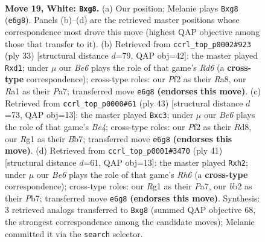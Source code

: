 \documentclass[11pt]{article}
\begin{document}
\clearpage

\begin{figure}[p]\centering
\begin{subfigure}{0.46\textwidth}\centering
\resizebox{\linewidth}{!}{%
\newchessgame
\chessboard[
  setfen={2kr2r1/1ppnp2p/2n1B1p1/p7/5B1P/N4P2/PbP1KP2/R5R1 w - - 2 19},
  showmover=false,
  pgfstyle=straightmove, color=movearrow, markmove={e6-g8}
]}
\caption{}
\end{subfigure}\hfill
\begin{subfigure}{0.46\textwidth}\centering
\resizebox{\linewidth}{!}{%
\newchessgame
\chessboard[
  setfen={r5k1/pb2pp1p/5bp1/8/8/2NrPN2/PP3PPP/3R1RK1 b - - 1 17},
  showmover=false,
  pgfstyle=straightmove, color=movearrow, markmove={d3-d1}
]}
\caption{}
\end{subfigure}
\\[4pt]
\begin{subfigure}{0.46\textwidth}\centering
\resizebox{\linewidth}{!}{%
\newchessgame
\chessboard[
  setfen={3r1rk1/1b3p2/pp4p1/3Pb2p/8/1PN3P1/P4PNP/2RR2K1 b - - 2 22},
  showmover=false,
  pgfstyle=straightmove, color=movearrow, markmove={e5-c3}
]}
\caption{}
\end{subfigure}\hfill
\begin{subfigure}{0.46\textwidth}\centering
\resizebox{\linewidth}{!}{%
\newchessgame
\chessboard[
  setfen={2r3k1/pp4pp/4p1n1/2p1b3/4P3/2PPB2r/PP2KN1P/R6R b - - 5 21},
  showmover=false,
  pgfstyle=straightmove, color=movearrow, markmove={h3-h2}
]}
\caption{}
\end{subfigure}
\caption{\textbf{Move 19, White: \texttt{Bxg8}.} (a) Our position; Melanie plays \texttt{Bxg8} (\texttt{e6g8}). Panels (b)--(d) are the retrieved master positions whose correspondence most drove this move (highest QAP objective among those that transfer to it). (b) Retrieved from \texttt{ccrl\_top\_p0002\#923} (ply 33) [structural distance $d$=79, QAP obj=42]: the master played \texttt{Rxd1}; under $\mu$ our \emph{Be6} plays the role of that game's \emph{Rd6} (a \textbf{cross-type} correspondence); cross-type roles: our \emph{P}f2 as their \emph{R}a8, our \emph{R}a1 as their \emph{P}a7; transferred move \texttt{e6g8} \textbf{(endorses this move)}. (c) Retrieved from \texttt{ccrl\_top\_p0000\#61} (ply 43) [structural distance $d$=73, QAP obj=13]: the master played \texttt{Bxc3}; under $\mu$ our \emph{Be6} plays the role of that game's \emph{Be4}; cross-type roles: our \emph{P}f2 as their \emph{R}d8, our \emph{R}g1 as their \emph{B}b7; transferred move \texttt{e6g8} \textbf{(endorses this move)}. (d) Retrieved from \texttt{ccrl\_top\_p0001\#3470} (ply 41) [structural distance $d$=61, QAP obj=13]: the master played \texttt{Rxh2}; under $\mu$ our \emph{Be6} plays the role of that game's \emph{Rh6} (a \textbf{cross-type} correspondence); cross-type roles: our \emph{R}g1 as their \emph{P}a7, our \emph{b}b2 as their \emph{P}b7; transferred move \texttt{e6g8} \textbf{(endorses this move)}. Synthesis: 3 retrieved analogs transferred to \texttt{Bxg8} (summed QAP objective 68, the strongest correspondence among the candidate moves); Melanie committed it via the \texttt{search} selector.}
\label{fig:thought-m36}
\end{figure}
\end{document}
